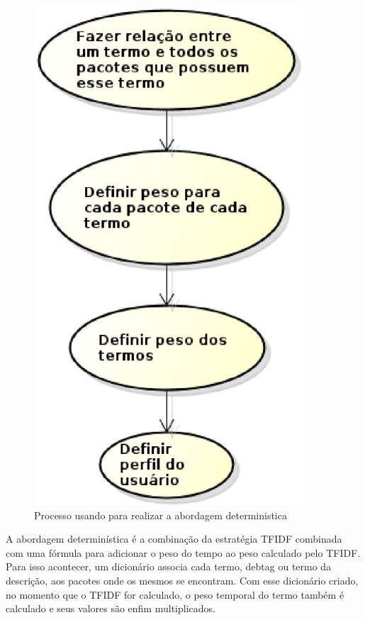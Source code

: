 \begin{figure}[h]
  \centering
  \includegraphics[width=0.9\textwidth]{figuras/abordagem_deterministica.eps}
  \caption{Processo usando para realizar a abordagem deterministica}
  \label{fig:abordagem_deterministica}
\end{figure}

A abordagem determinística é a combinação da estratégia TFIDF combinada com
uma fórmula para adicionar o peso do tempo ao peso calculado pelo TFIDF. Para
isso acontecer, um dicionário associa cada termo, debtag ou termo da
descrição, aos pacotes onde os mesmos se encontram. Com esse dicionário criado,
no momento que o TFIDF for calculado, o peso temporal do termo também é
calculado e seus valores são enfim multiplicados.


